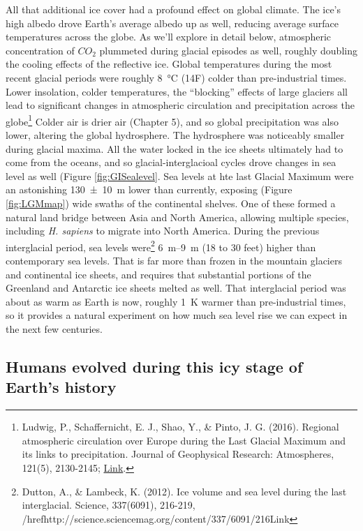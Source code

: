 \documentclass[amstex,12pt]{book}
\begin{document}
All that additional ice cover had a profound effect on global climate. The ice's high albedo drove Earth's average albedo up as well, reducing average surface temperatures across the globe. As we'll explore in detail below, atmospheric concentration of $CO_2$ plummeted during glacial episodes as well, roughly doubling the cooling effects of the reflective ice. Global temperatures during the most recent glacial periods were roughly \SI{8}{\celsius} (14\textdegree F) colder than pre-industrial times. Lower insolation, colder temperatures, the ``blocking'' effects of large glaciers all lead to significant changes in atmospheric circulation and precipitation across the globe\footnote{Ludwig, P., Schaffernicht, E. J., Shao, Y., \& Pinto, J. G. (2016). Regional atmospheric circulation over Europe during the Last Glacial Maximum and its links to precipitation. Journal of Geophysical Research: Atmospheres, 121(5), 2130-2145; \href{https://agupubs.onlinelibrary.wiley.com/doi/pdf/10.1002/2015JD024444}{Link}.} Colder air is drier air (Chapter 5), and so global precipitation was also lower, altering the global hydrosphere. The hydrosphere was noticeably smaller during glacial maxima. All the water locked in the ice sheets ultimately had to come from the oceans, and so glacial-interglacioal cycles drove changes in sea level as well (Figure \ref{fig:GISealevel}. Sea levels at hte last Glacial Maximum were an astonishing \SI{130(10)}{\metre} lower than currently, exposing (Figure \ref{fig:LGMmap}) wide swaths of the continental shelves. One of these formed a natural land bridge between Asia and North America, allowing multiple species, including \textit{H. sapiens} to migrate into North America. During the previous interglacial period, sea levels were\footnote{Dutton, A., \& Lambeck, K. (2012). Ice volume and sea level during the last interglacial. Science, 337(6091), 216-219, /href{http://science.sciencemag.org/content/337/6091/216}{Link}} \SIrange{6}{9}{\metre} (18 to 30 feet) higher than contemporary sea levels. That is far more than frozen in the mountain glaciers and continental ice sheets, and requires that substantial portions of the Greenland and Antarctic ice sheets melted as well. That interglacial period was about as warm as Earth is now, roughly \SI{1}{\kelvin} warmer than pre-industrial times, so it provides a natural experiment on how much sea level rise we can expect in the next few centuries.   
\subsection{Humans evolved during this icy stage of Earth’s history} 
\end{document}
